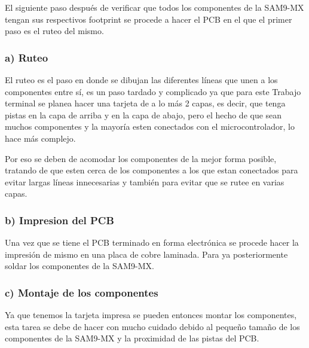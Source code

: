 El siguiente paso despu\'es de verificar que todos los componentes de la SAM9-MX tengan sus respectivos footprint se procede a hacer el PCB en el que el primer paso es el ruteo del mismo.\medskip

\subsubsection{a) Ruteo}\medskip

El ruteo es el paso en donde se dibujan las diferentes l\'ineas que unen a los componentes entre s\'i, es un paso tardado y complicado ya que para este Trabajo terminal se planea hacer una tarjeta de a lo m\'as 2 capas, es decir, que tenga pistas en la capa de arriba y en la capa de abajo, pero el hecho de que sean muchos componentes y la mayor\'ia esten conectados con el microcontrolador, lo hace m\'as complejo.\medskip

Por eso se deben de acomodar los componentes de la mejor forma posible, tratando de que esten cerca de los componentes a los que estan conectados para evitar largas l\'ineas innecesarias y tambi\'en para evitar que se rutee en varias capas.\medskip

\subsubsection{b) Impresion del PCB}\medskip

Una vez que se tiene el PCB terminado en forma electr\'onica se procede hacer la impresi\'on de mismo en una placa de cobre laminada. Para ya posteriormente soldar los componentes de la SAM9-MX.\medskip

\subsubsection{c) Montaje de los componentes}\medskip

Ya que tenemos la tarjeta impresa se pueden entonces montar los componentes, esta tarea se debe de hacer con mucho cuidado debido al peque\~no tama\~no de los componentes de la SAM9-MX y la proximidad de las pistas del PCB.\medskip



